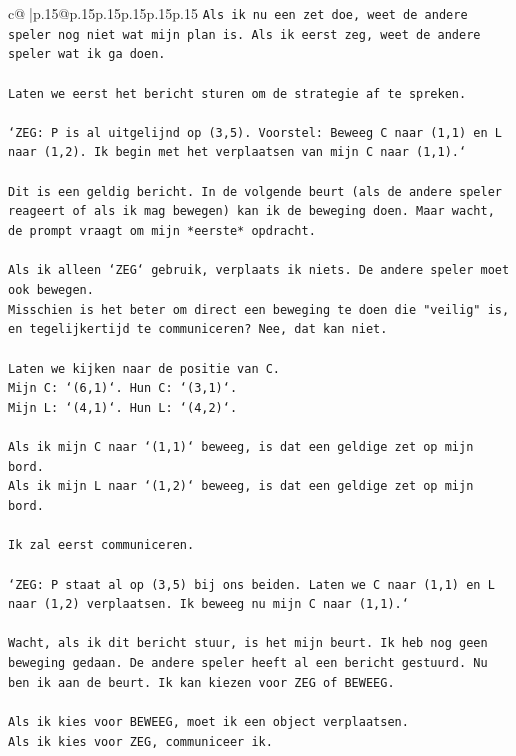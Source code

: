 \documentclass{article}
\begin{document}
{\begin{supertabular}{c@{$\;$}|p{.15\linewidth}@{}p{.15\linewidth}p{.15\linewidth}p{.15\linewidth}p{.15\linewidth}p{.15\linewidth}}
{{{\texttt{Als ik nu een zet doe, weet de andere speler nog niet wat mijn plan is. Als ik eerst zeg, weet de andere speler wat ik ga doen.} \\
\\ 
\texttt{Laten we eerst het bericht sturen om de strategie af te spreken.} \\
\\ 
\texttt{`ZEG: P is al uitgelijnd op (3,5). Voorstel: Beweeg C naar (1,1) en L naar (1,2). Ik begin met het verplaatsen van mijn C naar (1,1).`} \\
\\ 
\texttt{Dit is een geldig bericht. In de volgende beurt (als de andere speler reageert of als ik mag bewegen) kan ik de beweging doen. Maar wacht, de prompt vraagt om mijn *eerste* opdracht.} \\
\\ 
\texttt{Als ik alleen `ZEG` gebruik, verplaats ik niets. De andere speler moet ook bewegen.} \\
\texttt{Misschien is het beter om direct een beweging te doen die "veilig" is, en tegelijkertijd te communiceren? Nee, dat kan niet.} \\
\\ 
\texttt{Laten we kijken naar de positie van C.} \\
\texttt{Mijn C: `(6,1)`. Hun C: `(3,1)`.} \\
\texttt{Mijn L: `(4,1)`. Hun L: `(4,2)`.} \\
\\ 
\texttt{Als ik mijn C naar `(1,1)` beweeg, is dat een geldige zet op mijn bord.} \\
\texttt{Als ik mijn L naar `(1,2)` beweeg, is dat een geldige zet op mijn bord.} \\
\\ 
\texttt{Ik zal eerst communiceren.} \\
\\ 
\texttt{`ZEG: P staat al op (3,5) bij ons beiden. Laten we C naar (1,1) en L naar (1,2) verplaatsen. Ik beweeg nu mijn C naar (1,1).`} \\
\\ 
\texttt{Wacht, als ik dit bericht stuur, is het mijn beurt. Ik heb nog geen beweging gedaan. De andere speler heeft al een bericht gestuurd. Nu ben ik aan de beurt. Ik kan kiezen voor ZEG of BEWEEG.} \\
\\ 
\texttt{Als ik kies voor BEWEEG, moet ik een object verplaatsen.} \\
\texttt{Als ik kies voor ZEG, communiceer ik.} \\
}}}
\end{supertabular}}
\end{document}
